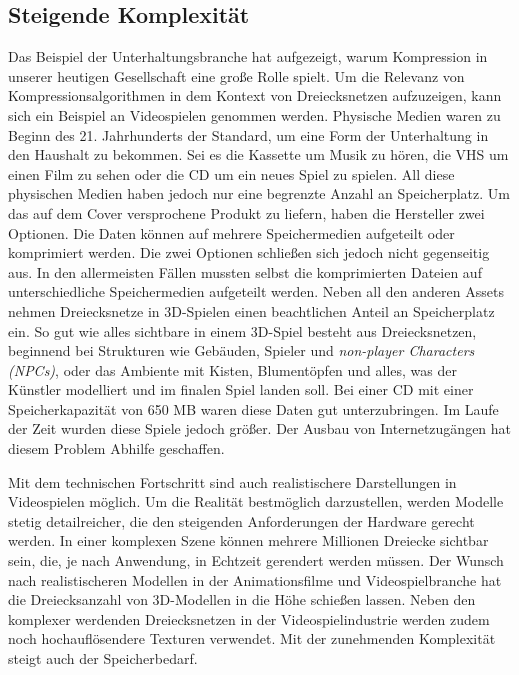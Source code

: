\subsection{Steigende Komplexität}
\label{subsec:steigende_komplexität}
Das Beispiel der Unterhaltungsbranche hat aufgezeigt, warum Kompression in unserer heutigen Gesellschaft eine große Rolle spielt.
Um die Relevanz von Kompressionsalgorithmen in dem Kontext von Dreiecksnetzen aufzuzeigen, kann sich ein Beispiel an Videospielen genommen werden.
Physische Medien waren zu Beginn des 21. Jahrhunderts der Standard, um eine Form der Unterhaltung in den Haushalt zu bekommen.
Sei es die Kassette um Musik zu hören, die VHS um einen Film zu sehen oder die CD um ein neues Spiel zu spielen.
All diese physischen Medien haben jedoch nur eine begrenzte Anzahl an Speicherplatz.
Um das auf dem Cover versprochene Produkt zu liefern, haben die Hersteller zwei Optionen.
Die Daten können auf mehrere Speichermedien aufgeteilt oder komprimiert werden.
Die zwei Optionen schließen sich jedoch nicht gegenseitig aus.
In den allermeisten Fällen mussten selbst die komprimierten Dateien auf unterschiedliche Speichermedien aufgeteilt werden.
Neben all den anderen Assets nehmen Dreiecksnetze in 3D-Spielen einen beachtlichen Anteil an Speicherplatz ein.
So gut wie alles sichtbare in einem 3D-Spiel besteht aus Dreiecksnetzen, beginnend bei Strukturen wie Gebäuden, Spieler und \textit{non-player Characters (NPCs)}, oder das Ambiente mit Kisten, Blumentöpfen und alles, was der Künstler modelliert und im finalen Spiel landen soll.
Bei einer CD mit einer Speicherkapazität von 650 MB waren diese Daten gut unterzubringen.
Im Laufe der Zeit wurden diese Spiele jedoch größer.
Der Ausbau von Internetzugängen hat diesem Problem Abhilfe geschaffen. \newline

Mit dem technischen Fortschritt sind auch realistischere Darstellungen in Videospielen möglich.
Um die Realität bestmöglich darzustellen, werden Modelle stetig detailreicher, die den steigenden Anforderungen der Hardware gerecht werden. 
In einer komplexen Szene können mehrere Millionen Dreiecke sichtbar sein, die, je nach Anwendung, in Echtzeit gerendert werden müssen.
Der Wunsch nach realistischeren Modellen in der Animationsfilme und Videospielbranche hat die Dreiecksanzahl von 3D-Modellen in die Höhe schießen lassen.
Neben den komplexer werdenden Dreiecksnetzen in der Videospielindustrie werden zudem noch hochauflösendere Texturen verwendet.
Mit der zunehmenden Komplexität steigt auch der Speicherbedarf. \newline

